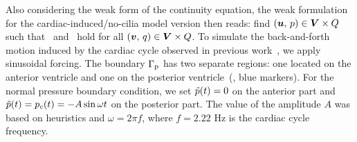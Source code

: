 \documentclass{WileyMSP-template}
\begin{document}
Also considering the weak form of the continuity equation,
the weak formulation for the cardiac-induced/no-cilia model version
then reads: find $(\bm{u},\, p)\in\bm{V}\times Q$
such that~ and~
hold for all $(\bm{v}, \, q)\in\bm{V}\times Q$.
To simulate the back-and-forth motion induced by the cardiac cycle observed in
previous work~\cite{Olstad2019CiliaryDevelopment}, we apply sinusoidal forcing.
The boundary $\Gamma_{\mathrm{p}}$ has two separate regions: one located on the
anterior ventricle and one on the posterior ventricle~(, blue markers).
For the normal pressure boundary condition, we set $\Tilde{p}(t) = 0$ on the anterior part and
$\Tilde{p}(t) = p_c(t) = -A\sin{\omega t}$ on the posterior part. The value of the amplitude
$A$ was based on heuristics and $\omega = 2\pi f$, where $f=2.22$ Hz
is the cardiac cycle frequency. 
\end{document}
